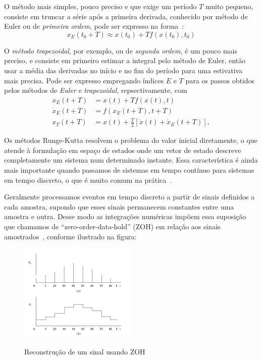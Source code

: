 O método mais simples, pouco preciso e que exige um período \(T\) muito pequeno, consiste em truncar a série após a primeira derivada, conhecido por método de Euler ou de \emph{primeira ordem},  pode ser expresso na forma~\cite{Stevens2016}:
\begin{equation}\label{eq:3.4-4}
    x_{E}\left(t_{0} + T \right) \approx x \left( t_{0} \right) + T f\left(x\left(t_{0}\right), t_{0}\right)
\end{equation}

O \emph{método trapezoidal}, por exemplo, ou de \emph{segunda ordem}, é um pouco mais preciso, e consiste em primeiro estimar a integral pelo método de Euler, então usar a média das derivadas no início e no fim do período para uma estivativa mais precisa. Pode ser expresso empregando índices \(E\) e \(T\) para os passos obtidos pelos métodos de \emph{Euler} e \emph{trapezoidal}, repsectivamente,  com~\cite{Stevens2016}
\begin{align}\label{eq:3.4-5}
    x_{E}\left(t + T\right) &= x\left(t\right) + T f\left(x\left(t\right),t\right) \\
    \dot{x}_{E}\left(t + T\right) &= {f{\left( x_{E} {\left( t + T \right)}, t+T \right)}} \\
    x_{T}\left(t + T\right) &= x\left(t\right) + \frac{T}{2} \left[ \dot{x}\left(t\right) + \dot{x}_{E}\left(t + T\right) \right],
\end{align}

Os métodos Runge-Kutta\footnotemark{} resolvem o problema do valor inicial diretamente, o que atende à formulação em espaço de estados onde um vetor de estado descreve completamente um sistema num determinado instante. Essa característica é ainda mais importante quando passamos de sistemas em tempo contínuo para sistemas em tempo discreto, o que é muito comum na prática~\cite{Stevens2016}.

Geralmente processamos eventos em tempo discreto a partir de sinais definidos a cada amostra, supondo que esses sinais permanecem constantes entre uma amostra e outra. Desse modo as integrações numéricas impõem essa suposição que chamamos de ``zero-order-data-hold'' (ZOH) em relação aos sinais amostrados~\cite{Stevens2016}, conforme ilustrado na figura:
\begin{figure}[H]
    \centering
    \caption{Reconstrução de um sinal usando ZOH}\label{fig:ZOH}
    \includegraphics[width=0.5\textwidth, keepaspectratio]{figuras/figure7.2-2.png}\label{fig7.2-2}
\end{figure}

